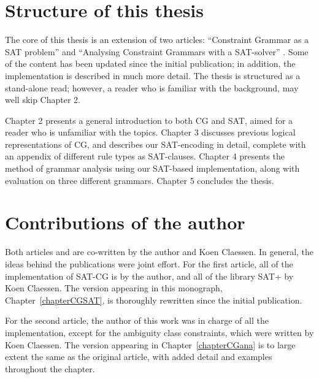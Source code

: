 \section{Structure of this thesis}

The core of this thesis is an extension of two articles: ``Constraint Grammar as a SAT problem'' \cite{listenmaa_claessen2015} and ``Analysing Constraint Grammars with a SAT-solver'' \cite{listenmaa_claessen2016}. Some of the content has been updated since the initial publication; in addition, the implementation is described in much more detail. The thesis is structured as a stand-alone read; however, a reader who is familiar with the background, may well skip Chapter 2.

Chapter 2 presents a general introduction to both CG and SAT, aimed for a reader who is unfamiliar with the topics.
Chapter 3 discusses previous logical representations of CG, and describes our SAT-encoding in detail, complete with an appendix of different rule types as SAT-clauses.
Chapter 4 presents the method of grammar analysis using our SAT-based implementation, along with evaluation on three different grammars.
Chapter 5 concludes the thesis.


\section{Contributions of the author}

Both articles \cite{listenmaa_claessen2015} and \cite{listenmaa_claessen2016}
are co-written by the author and Koen Claessen. In general, the ideas behind the publications were joint effort.
For the first article, all of the implementation of SAT-CG is by the author,
and all of the library SAT+ by Koen Claessen.
The version appearing in this monograph, Chapter~\ref{chapterCGSAT}, is thoroughly rewritten since the initial publication.

For the second article, the author of this work was in charge of all the implementation, except for the ambiguity class constraints, which were written by Koen Claessen. 
The version appearing in Chapter~\ref{chapterCGana} is to large extent the same as the original article, with added detail and examples throughout the chapter.


